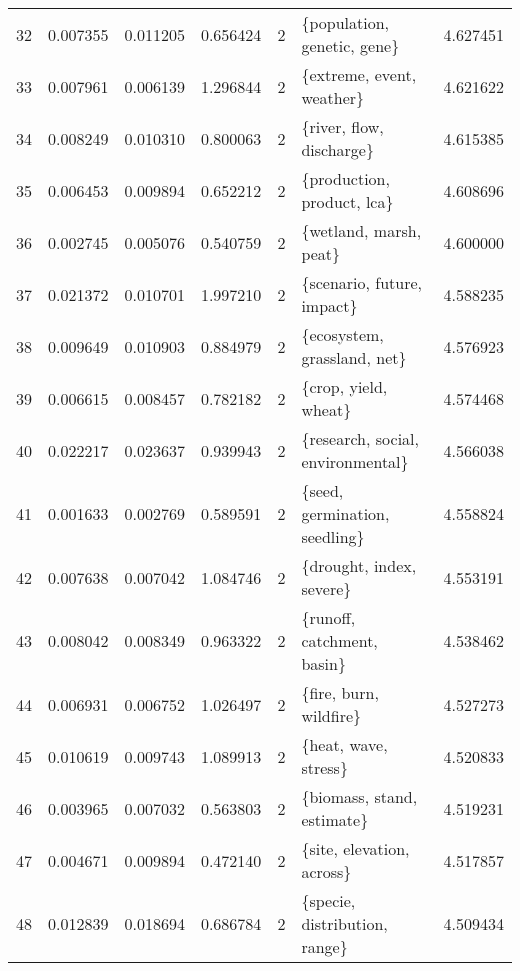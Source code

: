 \begin{tabular}{lrrrrlr}
32 &    0.007355 &  0.011205 &        0.656424 &           2 &             \{population, genetic, gene\} &  4.627451 \\
33 &    0.007961 &  0.006139 &        1.296844 &           2 &               \{extreme, event, weather\} &  4.621622 \\
34 &    0.008249 &  0.010310 &        0.800063 &           2 &                \{river, flow, discharge\} &  4.615385 \\
35 &    0.006453 &  0.009894 &        0.652212 &           2 &              \{production, product, lca\} &  4.608696 \\
36 &    0.002745 &  0.005076 &        0.540759 &           2 &                  \{wetland, marsh, peat\} &  4.600000 \\
37 &    0.021372 &  0.010701 &        1.997210 &           2 &              \{scenario, future, impact\} &  4.588235 \\
38 &    0.009649 &  0.010903 &        0.884979 &           2 &             \{ecosystem, grassland, net\} &  4.576923 \\
39 &    0.006615 &  0.008457 &        0.782182 &           2 &                    \{crop, yield, wheat\} &  4.574468 \\
40 &    0.022217 &  0.023637 &        0.939943 &           2 &       \{research, social, environmental\} &  4.566038 \\
41 &    0.001633 &  0.002769 &        0.589591 &           2 &           \{seed, germination, seedling\} &  4.558824 \\
42 &    0.007638 &  0.007042 &        1.084746 &           2 &                \{drought, index, severe\} &  4.553191 \\
43 &    0.008042 &  0.008349 &        0.963322 &           2 &              \{runoff, catchment, basin\} &  4.538462 \\
44 &    0.006931 &  0.006752 &        1.026497 &           2 &                  \{fire, burn, wildfire\} &  4.527273 \\
45 &    0.010619 &  0.009743 &        1.089913 &           2 &                    \{heat, wave, stress\} &  4.520833 \\
46 &    0.003965 &  0.007032 &        0.563803 &           2 &              \{biomass, stand, estimate\} &  4.519231 \\
47 &    0.004671 &  0.009894 &        0.472140 &           2 &               \{site, elevation, across\} &  4.517857 \\
48 &    0.012839 &  0.018694 &        0.686784 &           2 &           \{specie, distribution, range\} &  4.509434 \\

\end{tabular}

